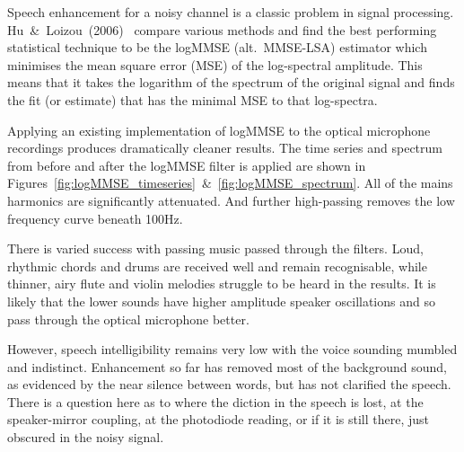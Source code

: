 \documentclass[prb,preprint]{revtex4-1}
\begin{document}
Speech enhancement for a noisy channel is a classic problem in signal processing. Hu~\&~Loizou~(2006)~\cite{SubjectiveComparison} compare various methods and find the best performing statistical technique to be the logMMSE (alt.\ MMSE-LSA) estimator which minimises the mean square error (MSE) of the log-spectral amplitude. This means that it takes the logarithm of the spectrum of the original signal and finds the fit (or estimate) that has the minimal MSE to that log-spectra.


Applying an existing implementation of logMMSE\cite{logmmse} to the optical microphone recordings produces dramatically cleaner results. The time series and spectrum from before and after the logMMSE filter is applied are shown in Figures~\ref{fig:logMMSE_timeseries}~\&~\ref{fig:logMMSE_spectrum}. All of the mains harmonics are significantly attenuated. And further high-passing removes the low frequency curve beneath 100Hz.


There is varied success with passing music passed through the filters. Loud, rhythmic chords and drums are received well and remain recognisable, while thinner, airy flute and violin melodies struggle to be heard in the results. It is likely that the lower sounds have higher amplitude speaker oscillations and so pass through the optical microphone better.


However, speech intelligibility remains very low with the voice sounding mumbled and indistinct. Enhancement so far has removed most of the background sound, as evidenced by the near silence between words, but has not clarified the speech. There is a question here as to where the diction in the speech is lost, at the speaker-mirror coupling, at the photodiode reading, or if it is still there, just obscured in the noisy signal.

\end{document}
